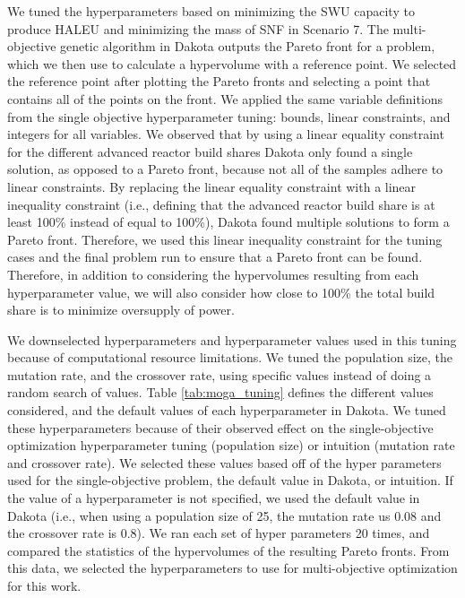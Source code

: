 We tuned the hyperparameters based on minimizing the \gls{SWU} capacity 
to produce \gls{HALEU} and minimizing the mass of \gls{SNF} in Scenario 7.
The multi-objective genetic algorithm in Dakota outputs the Pareto front 
for a problem, which we then use to calculate a hypervolume with a 
reference point. We selected the reference point after plotting the 
Pareto fronts and selecting a point that contains all of the points on 
the front. We applied the same variable definitions 
from the single objective hyperparameter 
tuning: bounds, linear constraints, and integers for 
all variables. We observed that by using a linear equality constraint for 
the different advanced reactor build shares 
Dakota only found a single solution, as opposed to a Pareto front, because 
not all of the samples adhere to linear constraints. By replacing the 
linear equality constraint with a linear 
inequality constraint (i.e., defining that the advanced reactor build share is 
at least 100\% instead of equal to 100\%), Dakota found multiple 
solutions to form a Pareto front. 
Therefore, we used this linear inequality constraint for the tuning cases and 
the final problem run to ensure that a Pareto front can be found. Therefore, 
in addition to considering the hypervolumes resulting from each hyperparameter 
value, we will also consider how close to 100\% the total build share is 
to minimize oversupply of power.

We downselected hyperparameters and hyperparameter values used in this 
tuning because of computational resource limitations. We tuned the 
population size, the mutation rate, and the crossover rate, using 
specific values instead of doing a random 
search of values. 
Table \ref{tab:moga_tuning} defines the different values considered, 
and the default values of each hyperparameter in Dakota. 
We tuned these hyperparameters because of their observed effect 
on the single-objective optimization hyperparameter tuning 
(population size) or intuition (mutation rate and crossover rate).
We selected these values 
based off of the hyper parameters used for the single-objective 
problem, the default value in Dakota, or intuition. If the value of a 
hyperparameter is not specified, we used the default value in Dakota
(i.e., when using a population size of 25, the mutation rate 
us 0.08 and the crossover rate is 0.8).
We ran each set of hyper 
parameters 20 times, and compared the statistics of the hypervolumes of 
the resulting Pareto fronts. From this data, we selected the 
hyperparameters to use for multi-objective optimization for this work. 

